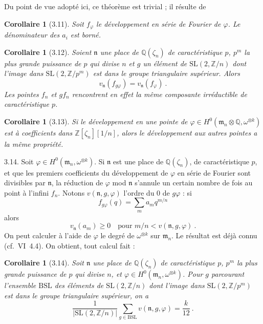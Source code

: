 \documentclass[12pt,a4paper]{amsart}
\theoremstyle{plain}
\newtheorem{corollaire}[proposition]{Corollaire}
\theoremstyle{definition}
\theoremstyle{remark}
\newcommand{\ZZ}{\mathbb{Z}}
\newcommand{\QQ}{\mathbb{Q}}
\begin{document}
Du point de vue adopt\'e ici, ce th\'eor\`eme est trivial ; il r\'esulte de

\begin{corollaire}[3.11]
Soit $f_\varphi$ le d\'eveloppement en s\'erie de Fourier de $\varphi$. Le d\'enominateur des $a_i$ est born\'e.
\end{corollaire}

\begin{corollaire}[3.12]
Soient $\mathfrak{n}$ une place de $\QQ(\zeta_n)$ de caract\'eristique $p$, $p^m$ la plus grande puissance de $p$ qui divise $n$ et $g$ un \'el\'ement de $\mathrm{SL}(2, \ZZ/n)$ dont l'image dans $\mathrm{SL}(2, \ZZ/p^m)$ est dans le groupe triangulaire sup\'erieur. Alors
\[
v_\mathfrak{n}(f_{g\varphi}) = v_\mathfrak{n}(f_\varphi) \ .
\]
Les pointes $f_n$ et $gf_n$ rencontrent en effet la m\^eme composante irr\'eductible de caract\'eristique $p$.
\end{corollaire}

\begin{corollaire}[3.13]
Si le d\'eveloppement en une pointe de $\varphi \in H^0(\mathfrak{m}_n \otimes \QQ, \omega^{\otimes k})$ est \`a coefficients dans $\ZZ[\zeta_n][1/n]$, alors le d\'eveloppement aux autres pointes a la m\^eme propri\'et\'e.
\end{corollaire}

3.14. Soit $\varphi \in H^0(\mathfrak{m}_n, \omega^{\otimes k})$. Si $\mathfrak{n}$ est une place de $\QQ(\zeta_n)$, de caract\'eristique $p$, et que les premiers coefficients du d\'eveloppement de $\varphi$ en s\'erie de Fourier sont divisibles par $\mathfrak{n}$, la r\'eduction de $\varphi$ mod $\mathfrak{n}$ s'annule un certain nombre de fois au point \`a l'infini $f_n$. Notons $v(\mathfrak{n}, g, \varphi)$ l'ordre du $0$ de $g\varphi$ : si
\[
f_{g\varphi}(q) = \sum_m a_m q^{m/n}
\]
alors
\[
v_\mathfrak{n}(a_m) \geq 0 \quad \text{pour } m/n < v(\mathfrak{n}, g, \varphi) \ .
\]
On peut calculer \`a l'aide de $\varphi$ le degr\'e de $\omega^{\otimes k}$ sur $\mathfrak{m}_n$. Le r\'esultat est d\'ej\`a connu (cf.~VI~4.4). On obtient, tout calcul fait :

\begin{corollaire}[3.14]
Soit $\mathfrak{n}$ une place de $\QQ(\zeta_n)$ de caract\'eristique $p$, $p^m$ la plus grande puissance de $p$ qui divise $n$, et $\varphi \in H^0(\mathfrak{m}_n, \omega^{\otimes k})$. Pour $g$ parcourant l'ensemble $\mathrm{BSL}$ des \'el\'ements de $\mathrm{SL}(2, \ZZ/n)$ dont l'image dans $\mathrm{SL}(2, \ZZ/p^m)$ est dans le groupe triangulaire sup\'erieur, on a
\[
\frac{1}{|\mathrm{SL}(2, \ZZ/n)|} \sum_{g \in \mathrm{BSL}} v(\mathfrak{n}, g, \varphi) = \frac{k}{12} \ .
\]
\end{corollaire}
\end{document}
